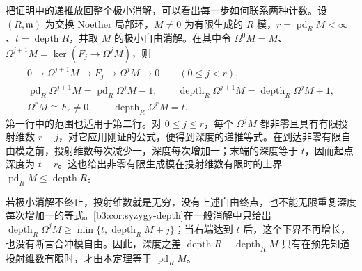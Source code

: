 把证明中的递推放回整个极小消解，可以看出每一步如何联系两种计数。设 \((R,\mathfrak m)\) 为交换 Noether 局部环，\(M\ne0\) 为有限生成的 \(R\) 模，\(r=\operatorname{pd}_RM<\infty\)、\(t=\operatorname{depth}R\)，并取 \(M\) 的极小自由消解。在其中令 \(\Omega^0M=M\)、\(\Omega^{j+1}M=\ker(F_j\to\Omega^jM)\)，则
\[
	\begin{gathered}
		0\longrightarrow\Omega^{j+1}M\longrightarrow F_j \longrightarrow\Omega^jM\longrightarrow0 \qquad(0\le j<r),\\[2pt]
		\operatorname{pd}_R\Omega^{j+1}M =\operatorname{pd}_R\Omega^jM-1, \qquad \operatorname{depth}_R\Omega^{j+1}M =\operatorname{depth}_R\Omega^jM+1,\\[2pt]
		\Omega^rM\cong F_r\ne0, \qquad \operatorname{depth}_R\Omega^rM=t.
	\end{gathered}
\]
第一行中的范围也适用于第二行。对 \(0\le j\le r\)，每个 \(\Omega^jM\) 都非零且具有有限投射维数 \(r-j\)，对它应用刚证的公式，便得到深度的递推等式。在到达非零有限自由模之前，投射维数每次减少一，深度每次增加一；末端的深度等于 \(t\)，因而起点深度为 \(t-r\)。这也给出非零有限生成模在投射维数有限时的上界 \(\operatorname{pd}_RM\le\operatorname{depth}R\)。

若极小消解不终止，投射维数就是无穷，没有上述自由终点，也不能无限重复深度每次增加一的等式。\cref{b3:cor:syzygy-depth}在一般消解中只给出 \(\operatorname{depth}_R\Omega^jM\ge\min\{t,\operatorname{depth}_RM+j\}\)；当右端达到 \(t\) 后，这个下界不再增长，也没有断言合冲模自由。因此，深度之差 \(\operatorname{depth}R-\operatorname{depth}_RM\) 只有在预先知道投射维数有限时，才由本定理等于 \(\operatorname{pd}_RM\)。
